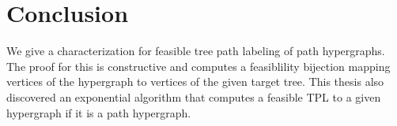 \documentclass[MS,synopsis]{iitmdiss}
\def \secfirstparatrim {-5mm}
\begin{document}


\section{Conclusion}
\label{sec:conclusion}
\vspace{\secfirstparatrim} 

We give a characterization for feasible tree path labeling of path
hypergraphs. The proof for this is constructive and computes a
feasiblility bijection mapping vertices of the hypergraph to vertices
of the given target tree. This thesis also discovered an exponential algorithm
that computes a feasible TPL to a given hypergraph if it is a path hypergraph.
\end{document}

